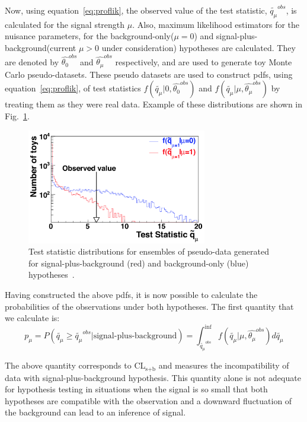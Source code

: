 Now, using equation~\ref{eq:proflik}, the observed value of the test statistic, $\tilde{q_\mu}^{obs}$, is calculated for the signal strength $\mu$. Also, maximum likelihood estimators for the nuisance parameters, for the background-only($\mu=0$) and signal-plus-background(current $\mu>0$ under consideration) hypotheses are calculated. They are denoted by $\hat{\theta_{0}}^{obs}$ and $\hat{\theta_\mu}^{obs}$ respectively, and are used to generate toy Monte Carlo pseudo-datasets. These pseudo datasets are used to construct  pdfs, using equation~\ref{eq:proflik}, of test statistics $f(\tilde{q_\mu}|0,\hat{\theta_{0}}^{obs})$ and $f(\tilde{q_\mu}|\mu,\hat{\theta_\mu}^{obs})$ by treating them as they were real data. Example of these distributions are shown in Fig.~\ref{fig:test_stat_dist}.
\begin{figure}[!htpb]\centering
 \includegraphics[width=0.70\textwidth]{plots_and_figures/chapter7/test_statistic_distri.png}
 \caption{Test statistic distributions for ensembles of pseudo-data generated for signal-plus-background (red) and background-only (blue) hypotheses~\cite{note2011}.}
 \label{fig:test_stat_dist}
\end{figure}


Having constructed the above pdfs, it is now possible to calculate the probabilities of the observations under both hypotheses. The first quantity that we calculate is:
\begin{equation}                                                                                                                                                                                                 \label{eq:pmu}                                                       p_\mu=P(\tilde{q_\mu}\geq \tilde{q_\mu}^{obs}|\text{signal-plus-background})=\int_{\tilde{q_\mu}^{obs}}^{\inf}f(\tilde{q_\mu}|\mu,\hat{\theta_\mu}^{obs})d\tilde{q_\mu}
\end{equation}

The above quantity corresponds to CL$_\text{s+b}$ and measures the incompatibility of data with signal-plus-background hypothesis. This quantity alone is not adequate for hypothesis testing in situations when the signal is so small that both hypotheses are compatible with the observation and a downward fluctuation of the background can lead to an inference of signal.

